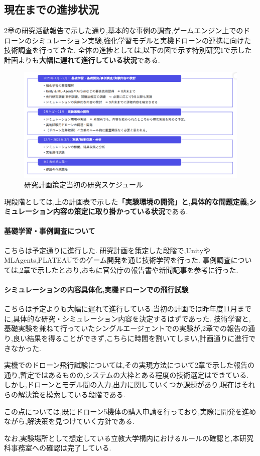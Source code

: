 \documentclass{article}[jsarticle]
\begin{document}
\subsection{現在までの進捗状況}
2章の研究活動報告で示した通り,基本的な事例の調査,ゲームエンジン上でのドローンのシミュレーション実験,強化学習モデルと実機ドローンの連携に向けた技術調査を行ってきた.
全体の進捗としては,以下の図で示す特別研究1で示した計画よりも\textbf{大幅に遅れて進行している状況}である.
\begin{figure}[H]
    \centering
    \includegraphics[width=\textwidth]{./Images/20240203171846.png}
    \captionsetup{justification=centering}
    \caption{研究計画策定当初の研究スケジュール}
\end{figure}
現段階としては,上の計画表で示した\textbf{「実験環境の開発」と,具体的な問題定義,シミュレーション内容の策定に取り掛かっている状況}である.
\paragraph{基礎学習・事例調査について}こちらは予定通りに進行した.
研究計画を策定した段階で,UnityやMLAgents,PLATEAUでのゲーム開発を通じ技術学習を行った.
事例調査については,2章で示したとおり,おもに官公庁の報告書や新聞記事を参考に行った.\par 
\paragraph{シミュレーションの内容具体化,実機ドローンでの飛行試験}
こちらは予定よりも大幅に遅れて進行している.当初の計画では昨年度11月までに,具体的な研究・シミュレーション内容を決定するはずであった.
技術学習と,基礎実験を兼ねて行っていたシングルエージェントでの実験が,2章での報告の通り,良い結果を得ることができず,こちらに時間を割いてしまい,計画通りに進行できなかった.\par 
実機でのドローン飛行試験については,その実現方法について2章で示した報告の通り,暫定ではあるものの,システムの大枠とある程度の技術選定はできている.
しかし,ドローンとモデル間の入力,出力に関していくつか課題があり,現在はそれらの解決策を模索している段階である.\par 
この点については,既にドローン5機体の購入申請を行っており,実際に開発を進めながら,解決策を見つけていく方針である.\par 
なお,実験場所として想定している立教大学構内におけるルールの確認と,本研究科事務室への確認は完了している.
\end{document}
